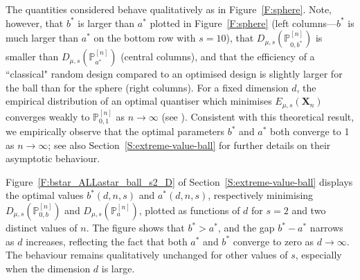 \documentclass{article}
\def\Xb{\mathbf{X}}
\def\PP{\mathbb{P}}
\def\SB{{\mathscr B}}
\def\SS{{\mathcal S}}
\begin{document}
The quantities considered behave qualitatively as in Figure~\ref{F:sphere}.  Note, however, that $b^*$ is larger than $a^*$ plotted in Figure~\ref{F:sphere} (left columns---$b^*$ is much larger than $a^*$ on the bottom row with $s=10$), that $D_{\mu,s}(\PP_{0,b^*}^{[n]})$ is smaller than $D_{\mu,s}(\PP_{a^*}^{[n]})$ (central columns), and that the efficiency of a ``classical" random design compared to an optimised design is slightly larger for the ball than for the sphere (right columns). %
For a fixed dimension $d$, the empirical distribution of an optimal quantiser which minimises $E_{\mu,s}(\Xb_n)$ converges weakly to $\PP_{0,1}^{[n]}$ as $n \to \infty$ (see \cite[Table~7.1]{GrafL2000}). Consistent with this theoretical result, we empirically observe that the optimal parameters $b^*$ and $a^*$ both converge to 1 as $n \to \infty$; see also Section~\ref{S:extreme-value-ball} for further details on their asymptotic behaviour.

Figure~\ref{F:bstar_ALLastar_ball_s2_D} of Section~\ref{S:extreme-value-ball} displays the optimal values $b^*(d,n,s)$ and $a^*(d,n,s)$, respectively minimising $D_{\mu,s}(\PP_{0,b}^{[n]})$ and $D_{\mu,s}(\PP_a^{[n]})$, plotted as functions of $d$ for $s=2$ and two distinct values of $n$. The figure shows that $b^*>a^*$, and the gap $b^*-a^*$ narrows as $d$ increases, reflecting the fact that both $a^*$ and $b^*$ converge to zero as $d\to\infty$. The behaviour remains qualitatively unchanged for other values of $s$, especially when the dimension $d$ is large.

\end{document}
